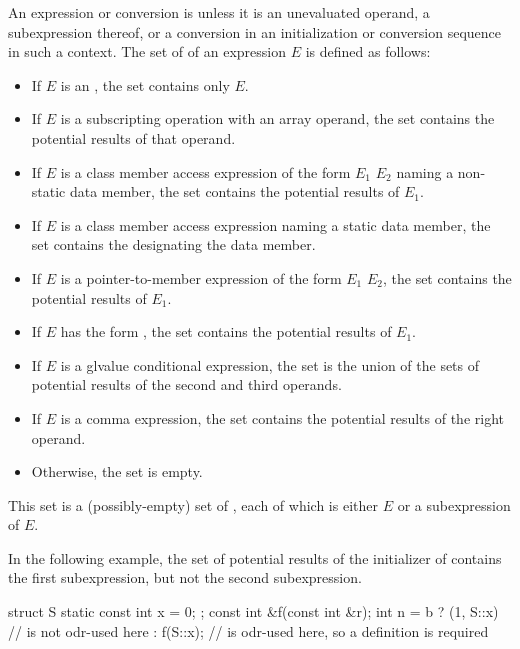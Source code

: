 \pnum
{}%
An expression or conversion is  unless it is
an unevaluated operand,
a subexpression thereof, or
a conversion in an initialization or conversion sequence in such a context.
The set of  of an expression $E$ is
defined as follows:
\begin{itemize}
\item If $E$ is an
, the set
contains only $E$.
\item If $E$ is a subscripting operation with
an array operand, the set contains the potential results of that operand.
\item If $E$ is a class member access
expression of the form
$E_1$   $E_2$
naming a non-static data member,
the set contains the potential results of $E_1$.
\item If $E$ is a class member access expression
naming a static data member,
the set contains the  designating the data member.
\item If $E$ is a pointer-to-member
expression of the form
$E_1$  $E_2$,
the set contains the potential results of $E_1$.
\item If $E$ has the form , the set contains the
potential results of $E_1$.
\item If $E$ is a glvalue conditional
expression, the set is the union of the sets of
potential results of the second and third operands.
\item If $E$ is a comma expression, the set
contains the potential results of the right operand.
\item Otherwise, the set is empty.
\end{itemize}
\begin{note}
This set is a (possibly-empty) set of ,
each of which is either $E$ or a subexpression of $E$.
\begin{example}
In the following example, the set of potential results of the initializer
of  contains the first  subexpression, but not the second
 subexpression.
\begin{codeblock}
struct S { static const int x = 0; };
const int &f(const int &r);
int n = b ? (1, S::x)           //  is not odr-used here
          : f(S::x);            //  is odr-used here, so a definition is required
\end{codeblock}
\end{example}
\end{note}

